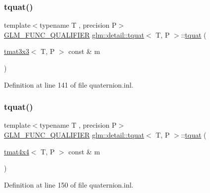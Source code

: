 \subsubsection{\texorpdfstring{tquat()}{tquat()}\hspace{0.1cm}{\footnotesize\ttfamily [7/9]}}
{\footnotesize\ttfamily template$<$typename T , precision P$>$ \\
\hyperlink{setup_8hpp_a33fdea6f91c5f834105f7415e2a64407}{G\+L\+M\+\_\+\+F\+U\+N\+C\+\_\+\+Q\+U\+A\+L\+I\+F\+I\+ER} \hyperlink{structglm_1_1detail_1_1tquat}{glm\+::detail\+::tquat}$<$ T, P $>$\+::\hyperlink{structglm_1_1detail_1_1tquat}{tquat} (\begin{DoxyParamCaption}\item[{\hyperlink{structglm_1_1detail_1_1tmat3x3}{tmat3x3}$<$ T, P $>$ const \&}]{m }\end{DoxyParamCaption})\hspace{0.3cm}{\ttfamily [explicit]}}



Definition at line 141 of file quaternion.\+inl.

\mbox{\label{structglm_1_1detail_1_1tquat_ad880a08dccbc297944a24204640c516d}} 
\subsubsection{\texorpdfstring{tquat()}{tquat()}\hspace{0.1cm}{\footnotesize\ttfamily [8/9]}}
{\footnotesize\ttfamily template$<$typename T , precision P$>$ \\
\hyperlink{setup_8hpp_a33fdea6f91c5f834105f7415e2a64407}{G\+L\+M\+\_\+\+F\+U\+N\+C\+\_\+\+Q\+U\+A\+L\+I\+F\+I\+ER} \hyperlink{structglm_1_1detail_1_1tquat}{glm\+::detail\+::tquat}$<$ T, P $>$\+::\hyperlink{structglm_1_1detail_1_1tquat}{tquat} (\begin{DoxyParamCaption}\item[{\hyperlink{structglm_1_1detail_1_1tmat4x4}{tmat4x4}$<$ T, P $>$ const \&}]{m }\end{DoxyParamCaption})\hspace{0.3cm}{\ttfamily [explicit]}}



Definition at line 150 of file quaternion.\+inl.

\mbox{\label{structglm_1_1detail_1_1tquat_a5a904126767e3f0d447ea22e27447e7e}} 

